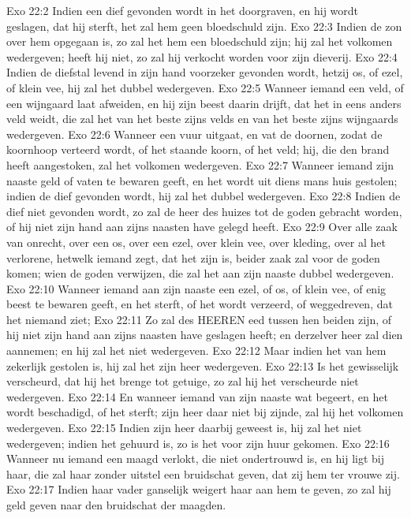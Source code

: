 Exo 22:2  Indien een dief gevonden wordt in het doorgraven, en hij wordt geslagen, dat hij sterft, het zal hem geen bloedschuld zijn.
Exo 22:3  Indien de zon over hem opgegaan is, zo zal het hem een bloedschuld zijn; hij zal het volkomen wedergeven; heeft hij niet, zo zal hij verkocht worden voor zijn dieverij.
Exo 22:4  Indien de diefstal levend in zijn hand voorzeker gevonden wordt, hetzij os, of ezel, of klein vee, hij zal het dubbel wedergeven.
Exo 22:5  Wanneer iemand een veld, of een wijngaard laat afweiden, en hij zijn beest daarin drijft, dat het in eens anders veld weidt, die zal het van het beste zijns velds en van het beste zijns wijngaards wedergeven.
Exo 22:6  Wanneer een vuur uitgaat, en vat de doornen, zodat de koornhoop verteerd wordt, of het staande koorn, of het veld; hij, die den brand heeft aangestoken, zal het volkomen wedergeven.
Exo 22:7  Wanneer iemand zijn naaste geld of vaten te bewaren geeft, en het wordt uit diens mans huis gestolen; indien de dief gevonden wordt, hij zal het dubbel wedergeven.
Exo 22:8  Indien de dief niet gevonden wordt, zo zal de heer des huizes tot de goden gebracht worden, of hij niet zijn hand aan zijns naasten have gelegd heeft.
Exo 22:9  Over alle zaak van onrecht, over een os, over een ezel, over klein vee, over kleding, over al het verlorene, hetwelk iemand zegt, dat het zijn is, beider zaak zal voor de goden komen; wien de goden verwijzen, die zal het aan zijn naaste dubbel wedergeven.
Exo 22:10  Wanneer iemand aan zijn naaste een ezel, of os, of klein vee, of enig beest te bewaren geeft, en het sterft, of het wordt verzeerd, of weggedreven, dat het niemand ziet;
Exo 22:11  Zo zal des HEEREN eed tussen hen beiden zijn, of hij niet zijn hand aan zijns naasten have geslagen heeft; en derzelver heer zal dien aannemen; en hij zal het niet wedergeven.
Exo 22:12  Maar indien het van hem zekerlijk gestolen is, hij zal het zijn heer wedergeven.
Exo 22:13  Is het gewisselijk verscheurd, dat hij het brenge tot getuige, zo zal hij het verscheurde niet wedergeven.
Exo 22:14  En wanneer iemand van zijn naaste wat begeert, en het wordt beschadigd, of het sterft; zijn heer daar niet bij zijnde, zal hij het volkomen wedergeven.
Exo 22:15  Indien zijn heer daarbij geweest is, hij zal het niet wedergeven; indien het gehuurd is, zo is het voor zijn huur gekomen.
Exo 22:16  Wanneer nu iemand een maagd verlokt, die niet ondertrouwd is, en hij ligt bij haar, die zal haar zonder uitstel een bruidschat geven, dat zij hem ter vrouwe zij.
Exo 22:17  Indien haar vader ganselijk weigert haar aan hem te geven, zo zal hij geld geven naar den bruidschat der maagden.

